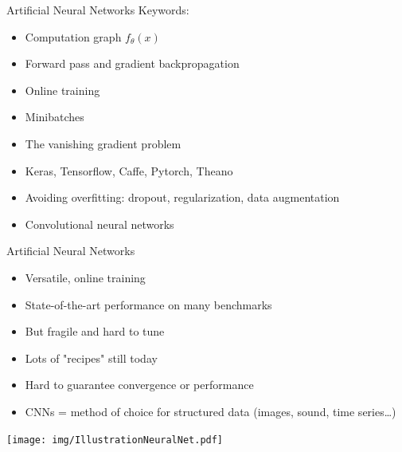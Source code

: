 \documentclass{beamer}
\begin{document}
\begin{frame}{Artificial Neural Networks}
Keywords:
\begin{itemize}
\item Computation graph $f_\theta(x)$
\item Forward pass and gradient backpropagation
\item Online training
\item Minibatches
\item The vanishing gradient problem
\item Keras, Tensorflow, Caffe, Pytorch, Theano
\item Avoiding overfitting: dropout, regularization, data augmentation
\item Convolutional neural networks
\end{itemize}
\end{frame}

\begin{frame}{Artificial Neural Networks}
\begin{itemize}
\item Versatile, online training
\item State-of-the-art performance on many benchmarks
\item But fragile and hard to tune
\item Lots of "recipes" still today
\item Hard to guarantee convergence or performance
\item CNNs = method of choice for structured data (images, sound, time series\ldots)
\end{itemize}
\begin{center}
\texttt{[image: img/IllustrationNeuralNet.pdf]}
\end{center}
\end{frame}
\end{document}
